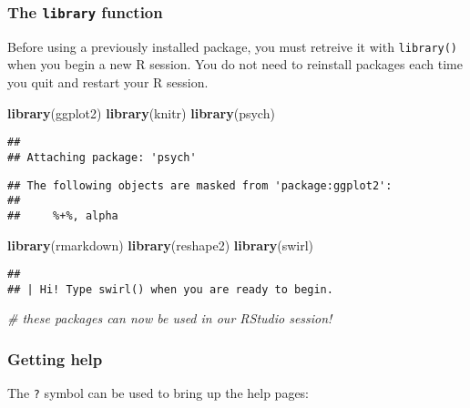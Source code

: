 \documentclass[]{article}
\newenvironment{Shaded}{\begin{snugshade}}{\end{snugshade}}
\newcommand{\KeywordTok}[1]{\textcolor[rgb]{0.13,0.29,0.53}{\textbf{#1}}}
\newcommand{\CommentTok}[1]{\textcolor[rgb]{0.56,0.35,0.01}{\textit{#1}}}
\newcommand{\NormalTok}[1]{#1}
\begin{document}
\subsubsection{\texorpdfstring{The \texttt{library}
function}{The library function}}\label{the-library-function}

Before using a previously installed package, you must retreive it with
\texttt{library()} when you begin a new R session. You do not need to
reinstall packages each time you quit and restart your R session.

\begin{Shaded}
\begin{Highlighting}[]
\KeywordTok{library}\NormalTok{(ggplot2)}
\KeywordTok{library}\NormalTok{(knitr)}
\KeywordTok{library}\NormalTok{(psych)}
\end{Highlighting}
\end{Shaded}

\begin{verbatim}
## 
## Attaching package: 'psych'
\end{verbatim}

\begin{verbatim}
## The following objects are masked from 'package:ggplot2':
## 
##     %+%, alpha
\end{verbatim}

\begin{Shaded}
\begin{Highlighting}[]
\KeywordTok{library}\NormalTok{(rmarkdown)}
\KeywordTok{library}\NormalTok{(reshape2)}
\KeywordTok{library}\NormalTok{(swirl)}
\end{Highlighting}
\end{Shaded}

\begin{verbatim}
## 
## | Hi! Type swirl() when you are ready to begin.
\end{verbatim}

\begin{Shaded}
\begin{Highlighting}[]
\CommentTok{# these packages can now be used in our RStudio session!}
\end{Highlighting}
\end{Shaded}

\subsubsection{Getting help}\label{getting-help}

The \texttt{?} symbol can be used to bring up the help pages:
\end{document}
